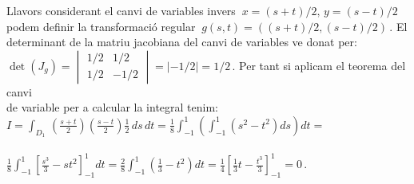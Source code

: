 \documentclass[12pt]{article}
\begin{document}
\vspace*{1cm}

Llavors considerant el canvi de variables invers $\ x=(s+t)/2,\,
y=(s-t)/2\ $ podem definir la transformaci{\'o} regular $\
g(s,t)=((s+t)/2, (s-t)/2)\,. $ El determinant de la matriu jacobiana
del canvi de variables ve donat per:\\

\hspace*{1cm} $\det(J_g)=
\begin{vmatrix}
1/2 & 1/2\\ 1/2 & -1/2
\end{vmatrix}=|-1/2|=1/2\,.$ Per tant si aplicam el teorema del
canvi\\

 de variable per a calcular la integral tenim:\\

\hspace*{1cm} $I=\displaystyle\int_{D_1}\,
\left(\frac{s+t}{2}\right)\left(\frac{s-t}{2}\right)\frac{1}{2}\,ds\,dt=
\frac{1}{8}\int_{-1}^1\left(\int_{-1}^1(s^2-t^2)ds\right)dt=$\\\\


\hspace*{1cm}
$\displaystyle\frac{1}{8}\int_{-1}^1\left[\frac{s^3}{3}- s
t^2\right]_{-1}^1dt= \frac{2}{8}\int_{-1}^1(\frac{1}{3}-  t^2)dt=
\frac{1}{4}\left[\frac{1}{3}t-\frac{t^3}{3}\right]_{-1}^1=0\,.$
\end{document}
